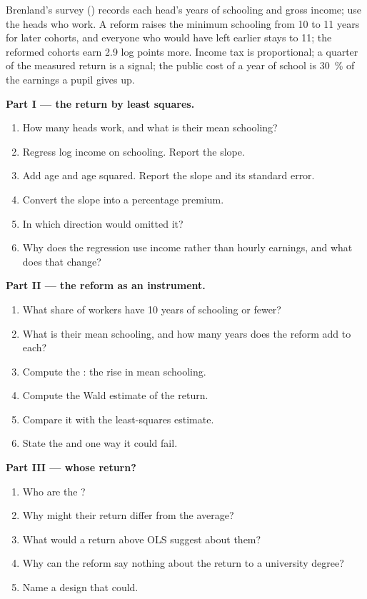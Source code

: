 \begin{problem}\label{pb:b3:human-capital:school}
Brenland's survey () records each head's years of schooling and
gross income; use the heads who work. A reform raises the minimum schooling from 10 to
11 years for later cohorts, and everyone who would have left earlier stays to 11; the
reformed cohorts earn 2.9 log points more. Income tax is proportional; a quarter of
the measured return is a signal; the public cost of a year of school is 30~\% of the
earnings a pupil gives up. %

\medskip\noindent\textbf{Part I --- the return by least squares.}
\begin{enumerate}
\item How many heads work, and what is their mean schooling?
\item Regress log income on schooling. Report the slope.
\item Add age and age squared. Report the slope and its standard error.
\item Convert the slope into a percentage premium.
\item In which direction would omitted  it?
\item Why does the regression use income rather than hourly earnings, and what does
that change?
\end{enumerate}

\medskip\noindent\textbf{Part II --- the reform as an instrument.}
\begin{enumerate}[resume]
\item What share of workers have 10 years of schooling or fewer?
\item What is their mean schooling, and how many years does the reform add to each?
\item Compute the : the rise in mean schooling.
\item Compute the Wald estimate of the return.
\item Compare it with the least-squares estimate.
\item State the  and one way it could fail.
\end{enumerate}

\medskip\noindent\textbf{Part III --- whose return?}
\begin{enumerate}[resume]
\item Who are the ?
\item Why might their return differ from the average?
\item What would a return above OLS suggest about them?
\item Why can the reform say nothing about the return to a university degree?
\item Name a design that could.
\end{enumerate}


\end{problem}
